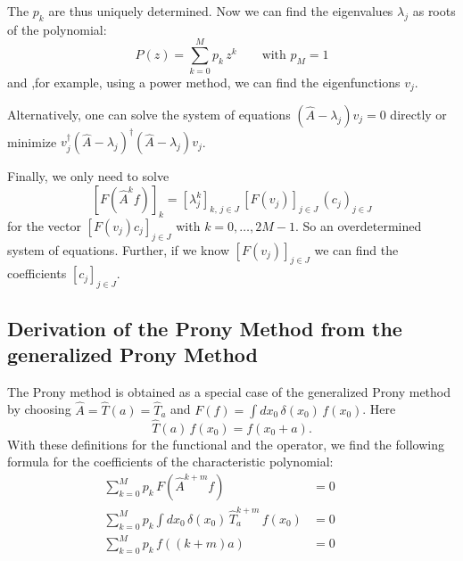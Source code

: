 The $p_k$ are thus uniquely determined. Now we can find the eigenvalues $\lambda_j$ as roots of the polynomial:
\begin{equation*}
    P(z) = \sum_{k=0}^{M} p_k\, z^{k} \qquad \text{with } p_M = 1
\end{equation*}
and ,for example, using a power method, we can find the eigenfunctions $v_j$.

Alternatively, one can solve the system of equations $(\hat{A} - \lambda_j) v_j = 0$ directly or minimize $v_j^{\dagger}(\hat{A} - \lambda_j)^{\dagger}(\hat{A} - \lambda_j) v_j$.

Finally, we only need to solve
\begin{equation*}
    \left[ F(\hat{A}^k f) \right]_k = \left[ \lambda_j^{k} \right]_{k,\, j \in J}\, \left[ F(v_j) \right]_{j \in J}\, \left( c_j \right)_{j \in J}
\end{equation*}
for the vector $\left[ F(v_j) c_j \right]_{j \in J}$ with $k = 0, \dots, 2M-1$. So an overdetermined system of equations. Further,
if we know $\left[F(v_j)\right]_{j \in J}$ we can find the coefficients $\left[ c_j \right]_{j \in J}$.

\subsection{Derivation of the Prony Method from the generalized Prony Method}

The Prony method is obtained as a special case of the generalized Prony method by choosing $\hat{A} = \hat{T}(a) = \hat{T}_a$ and $F(f) = \int dx_0\, \delta(x_0)\, f(x_0)$. Here
\begin{equation*}
    \hat{T}(a)\, f(x_0) = f(x_0 + a).
\end{equation*}
With these definitions for the functional and the operator, we find the following formula for the coefficients of the characteristic polynomial:
\begin{align*}
    \sum_{k=0}^{M} p_k\, F(\hat{A}^{k+m} f) &= 0 \\
    \sum_{k=0}^{M} p_k \int dx_0\, \delta(x_0)\, \hat{T}_a^{k+m}\, f(x_0) &= 0 \\
    \sum_{k=0}^{M} p_k\, f((k+m)a) &= 0 \qquad 
\end{align*}

